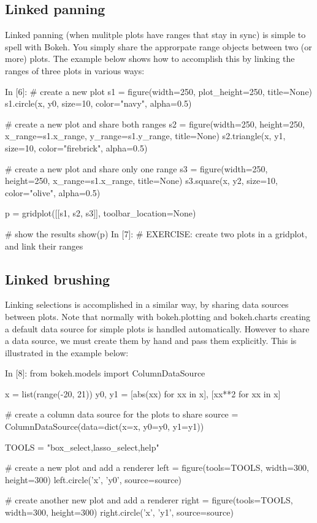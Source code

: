 \documentclass[a4paper,12pt]{article}
\begin{document}
\subsection{Linked panning}
Linked panning (when mulitple plots have ranges that stay in sync) is simple to spell with Bokeh. You simply share the approrpate range objects between two (or more) plots. The example below shows how to accomplish this by linking the ranges of three plots in various ways:

In [6]:
# create a new plot
s1 = figure(width=250, plot_height=250, title=None)
s1.circle(x, y0, size=10, color="navy", alpha=0.5)

# create a new plot and share both ranges
s2 = figure(width=250, height=250, x_range=s1.x_range, y_range=s1.y_range, title=None)
s2.triangle(x, y1, size=10, color="firebrick", alpha=0.5)

# create a new plot and share only one range
s3 = figure(width=250, height=250, x_range=s1.x_range, title=None)
s3.square(x, y2, size=10, color="olive", alpha=0.5)

p = gridplot([[s1, s2, s3]], toolbar_location=None)

# show the results
show(p)
In [7]:
# EXERCISE: create two plots in a gridplot, and link their ranges
\subsection{Linked brushing}
Linking selections is accomplished in a similar way, by sharing data sources between plots. Note that normally with bokeh.plotting and bokeh.charts creating a default data source for simple plots is handled automatically. However to share a data source, we must create them by hand and pass them explicitly. This is illustrated in the example below:

In [8]:
from bokeh.models import ColumnDataSource

x = list(range(-20, 21))
y0, y1 = [abs(xx) for xx in x], [xx**2 for xx in x]

# create a column data source for the plots to share
source = ColumnDataSource(data=dict(x=x, y0=y0, y1=y1))

TOOLS = "box_select,lasso_select,help"

# create a new plot and add a renderer
left = figure(tools=TOOLS, width=300, height=300)
left.circle('x', 'y0', source=source)

# create another new plot and add a renderer
right = figure(tools=TOOLS, width=300, height=300)
right.circle('x', 'y1', source=source)
\end{document}
